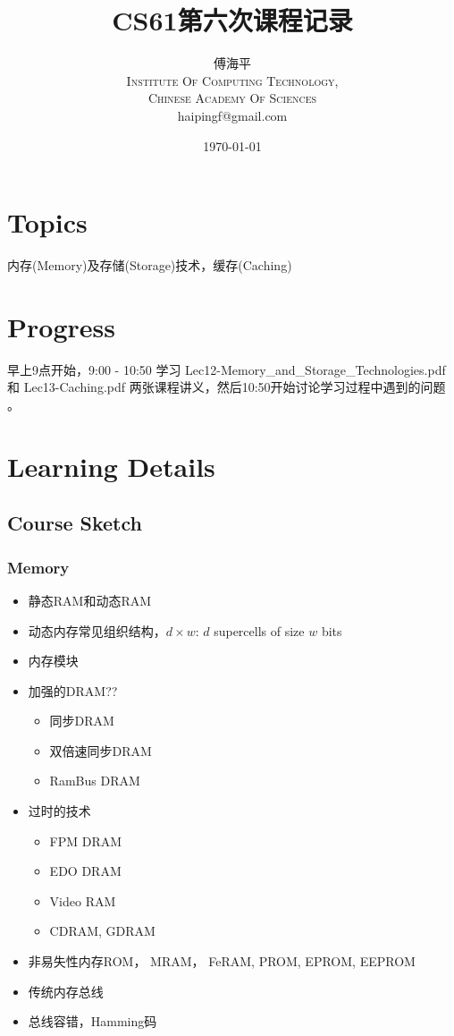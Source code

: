 \documentclass[a4paper, 11pt]{article}
\title{CS61第六次课程记录}
\author{傅海平\\
\textsc{Institute Of Computing Technology,}\\
\textsc{Chinese Academy Of Sciences}\\
haipingf@gmail.com\\
}
\date{\today}
\begin{document}
\maketitle
\newpage
\tableofcontents
\newpage
\section{Topics}
\begin{center}
\Large{内存(Memory)及存储(Storage)技术，缓存(Caching)}
\end{center}

\section{Progress}
早上9点开始，9:00 - 10:50 学习 Lec12-Memory\_and\_Storage\_Technologies.pdf 和
Lec13-Caching.pdf 两张课程讲义，然后10:50开始讨论学习过程中遇到的问题
。
\section{Learning Details}
\subsection{Course Sketch}
\subsubsection{Memory}
\begin{itemize}
  \item{静态RAM和动态RAM}
  \item{动态内存常见组织结构，$d \times w$: $d$ supercells of size $w$ bits}

  \item{内存模块}
  \item{加强的DRAM??}
	\begin{itemize}
	  \item{同步DRAM}
	  \item{双倍速同步DRAM}
	  \item{RamBus DRAM}
	  \end{itemize}
	\item{过时的技术}
	  \begin{itemize}
		\item{FPM DRAM}
		\item{EDO DRAM}
		\item{Video RAM}
		\item{CDRAM, GDRAM}
		\end{itemize}
	  \item{非易失性内存ROM， MRAM， FeRAM, PROM, EPROM, EEPROM}
	  \item{传统内存总线}
	  \item{总线容错，Hamming码}
  \end{itemize}
\end{document}
